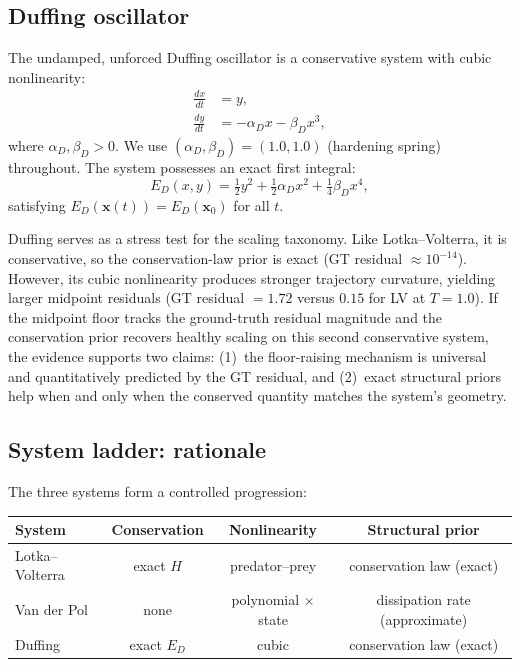 \documentclass[11pt]{article}
\begin{document}
\subsection{Duffing oscillator}
\label{sec:duffing-system}

The undamped, unforced Duffing oscillator is a conservative system with cubic nonlinearity:
\begin{align}
\frac{dx}{dt} &= y, \label{eq:duf-x} \\
\frac{dy}{dt} &= -\alpha_D x - \beta_D x^3, \label{eq:duf-y}
\end{align}
where $\alpha_D, \beta_D > 0$.
We use $(\alpha_D, \beta_D) = (1.0, 1.0)$ (hardening spring) throughout.
The system possesses an exact first integral:
\begin{equation}
E_D(x, y) = \tfrac{1}{2}y^2 + \tfrac{1}{2}\alpha_D x^2 + \tfrac{1}{4}\beta_D x^4,
\label{eq:duffing-energy}
\end{equation}
satisfying $E_D(\bm{x}(t)) = E_D(\bm{x}_0)$ for all $t$.

Duffing serves as a stress test for the scaling taxonomy.
Like Lotka--Volterra, it is conservative, so the conservation-law prior is exact (GT residual $\approx 10^{-14}$).
However, its cubic nonlinearity produces stronger trajectory curvature, yielding larger midpoint residuals (GT residual $= 1.72$ versus $0.15$ for LV at $T = 1.0$).
If the midpoint floor tracks the ground-truth residual magnitude and the conservation prior recovers healthy scaling on this second conservative system, the evidence supports two claims: (1)~the floor-raising mechanism is universal and quantitatively predicted by the GT residual, and (2)~exact structural priors help when and only when the conserved quantity matches the system's geometry.

\subsection{System ladder: rationale}
\label{sec:system-ladder}

The three systems form a controlled progression:

\begin{center}
\begin{tabular}{lccc}
\toprule
System & Conservation & Nonlinearity & Structural prior \\
\midrule
Lotka--Volterra & exact $H$ & predator--prey & conservation law (exact) \\
Van der Pol & none & polynomial $\times$ state & dissipation rate (approximate) \\
Duffing & exact $E_D$ & cubic & conservation law (exact) \\
\bottomrule
\end{tabular}
\end{center}
\end{document}
